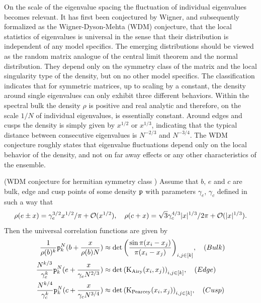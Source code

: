 On the scale of the eigenvalue spacing the fluctuation of individual eigenvalues becomes relevant. It has first been conjectured by Wigner, and subsequently formalized as the Wigner-Dyson-Mehta (WDM) conjecture, that the local statistics of eigenvalues is universal in the sense that their distribution is independent of any model specifics. The emerging distributions should be viewed as the random matrix analogue of the central limit theorem and the normal distribution. They depend only on the symmetry class of the matrix and the local singularity type of the density, but on no other model specifics. The classification indicates that for symmetric matrices, up to scaling by a constant, the density around single eigenvalues can only exhibit three different behaviors. Within the spectral bulk the density $\rho$ is positive and real analytic and therefore, on the scale $1/N$ of individual eigenvalues, is essentially constant. Around edges and cusps the density is simply given by $x^{1/2}$ or $x^{1/3}$, indicating that the typical distance between consecutive eigenvalues is $N^{-2/3}$ and $N^{-3/4}$. The WDM conjecture roughly states that eigenvalue fluctuations depend only on the local behavior of the density, and not on far away effects or any other characteristics of the ensemble.

\begin{conjecture}
	(WDM conjecture for hermitian symmetry class \cite{Schroder2019})
	Assume that $b$, $e$ and $c$ are bulk, edge and cusp points of some density $\mathtt{p}$ with parameters $\gamma_e$, $\gamma_c$ defined in such a way that
	\begin{equation}
		\rho(e \pm x) = \gamma_{e}^{3/2} x^{1/2} / \pi + \mathcal{O}(x^{1/2}), \quad  \rho(c + x) = \sqrt{3} \gamma_c^{4/3} |x|^{1/3}/2\pi + \mathcal{O}(|x|^{1/3}).
	\end{equation}
	Then the universal correlation functions are given by
	\begin{align}
		\frac{1}{\rho(b)^k} \mathtt{p}_k^{N}(b + \frac{x}{\rho(b) N }) & \approx \det{\left(\frac{\sin{\pi(x_i - x_j)}}{\pi(x_i - x_j)} \right)_{i,j \in [k]}}, \quad (Bulk) \\
		\frac{N^{k/3}}{\gamma_e^k} \mathtt{p}_k^{N}(e + \frac{x}{\gamma_e N^{2/3} }) & \approx \det{\left(\operatorname{K}_{\text{Airy}}(x_i, x_j) \right)_{i,j \in [k]}}, \quad (Edge) \\
		\frac{N^{k/4}}{\gamma_c^k} \mathtt{p}_k^{N}(c + \frac{x}{\gamma_c N^{3/4} }) & \approx \det{\left(\operatorname{K}_{\text{Pearcey}}(x_i, x_j) \right)_{i,j \in [k]}}, \quad (Cusp)
	\end{align}
\end{conjecture}

